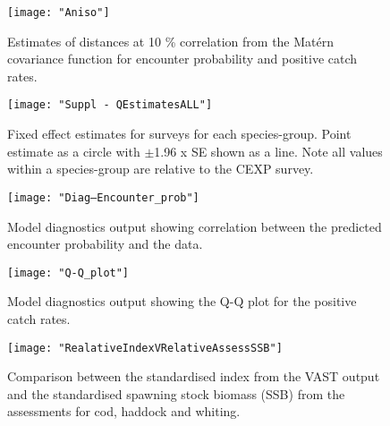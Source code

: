 \documentclass{article}
\begin{document}
\begin{figure}[!ht]
\begin{center}
	\texttt{[image: "Aniso"]}
	\label{fig:S11}
	\caption{Estimates of distances at 10 \% correlation from the Matérn
		covariance function for encounter probability and positive
		catch rates.}
	\end{center}
\end{figure}


\begin{figure}[!ht]
\begin{center}
	\texttt{[image: "Suppl - QEstimatesALL"]}
	\label{fig:S12}
	\caption{Fixed effect estimates for surveys for each species-group.
		Point estimate as a circle with $\pm$1.96 x SE shown as a line.
		Note all values within a species-group are relative to the CEXP
		survey.}
	\end{center}
\end{figure}

\begin{figure}[!ht]
\begin{center}
	\texttt{[image: "Diag--Encounter\_prob"]}
	\label{fig:S13}
	\caption{Model diagnostics output showing correlation between the
		predicted encounter probability and the data.}
	\end{center}
\end{figure}

\begin{figure}[!ht]
\begin{center}
	\texttt{[image: "Q-Q\_plot"]}
	\label{fig:S14}
	\caption{Model diagnostics output showing the Q-Q plot for the positive
	catch rates.}
	\end{center}
\end{figure}

\begin{figure}[!ht]
\begin{center}
	\texttt{[image: "RealativeIndexVRelativeAssessSSB"]}
	\label{fig:S15}
	\caption{Comparison between the standardised index from the VAST
		output and the standardised spawning stock biomass (SSB) from
		the assessments for cod, haddock and whiting.}
	\end{center}
\end{figure}
\end{document}
